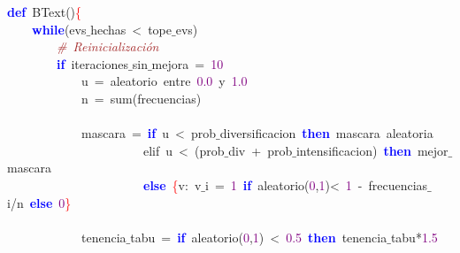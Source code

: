 \noindent
\mbox{}\textbf{\textcolor{Blue}{def}}\ BText\textcolor{BrickRed}{()}\textcolor{Red}{\{} \\
\mbox{}\ \ \ \ \textbf{\textcolor{Blue}{while}}\textcolor{BrickRed}{(}evs$\_$hechas\ \textcolor{BrickRed}{\textless{}}\ tope$\_$evs\textcolor{BrickRed}{)} \\
\mbox{}\ \ \ \ \ \ \ \ \textit{\textcolor{Brown}{\#\ Reinicialización}} \\
\mbox{}\ \ \ \ \ \ \ \ \textbf{\textcolor{Blue}{if}}\ iteraciones$\_$sin$\_$mejora\ \textcolor{BrickRed}{=}\ \textcolor{Purple}{10} \\
\mbox{}\ \ \ \ \ \ \ \ \ \ \ \ u\ \textcolor{BrickRed}{=}\ aleatorio\ entre\ \textcolor{Purple}{0.0}\ y\ \textcolor{Purple}{1.0} \\
\mbox{}\ \ \ \ \ \ \ \ \ \ \ \ n\ \textcolor{BrickRed}{=}\ sum\textcolor{BrickRed}{(}frecuencias\textcolor{BrickRed}{)} \\
\mbox{} \\
\mbox{}\ \ \ \ \ \ \ \ \ \ \ \ mascara\ \textcolor{BrickRed}{=}\ \textbf{\textcolor{Blue}{if}}\ u\ \textcolor{BrickRed}{\textless{}}\ prob$\_$diversificacion\ \textbf{\textcolor{Blue}{then}}\ mascara\ aleatoria \\
\mbox{}\ \ \ \ \ \ \ \ \ \ \ \ \ \ \ \ \ \ \ \ \ \ elif\ u\ \textcolor{BrickRed}{\textless{}}\ \textcolor{BrickRed}{(}prob$\_$div\ \textcolor{BrickRed}{+}\ prob$\_$intensificacion\textcolor{BrickRed}{)}\ \textbf{\textcolor{Blue}{then}}\ mejor$\_$mascara \\
\mbox{}\ \ \ \ \ \ \ \ \ \ \ \ \ \ \ \ \ \ \ \ \ \ \textbf{\textcolor{Blue}{else}}\ \textcolor{Red}{\{}v\textcolor{BrickRed}{:}\ v$\_$i\ \textcolor{BrickRed}{=}\ \textcolor{Purple}{1}\ \textbf{\textcolor{Blue}{if}}\ aleatorio\textcolor{BrickRed}{(}\textcolor{Purple}{0}\textcolor{BrickRed}{,}\textcolor{Purple}{1}\textcolor{BrickRed}{)\textless{}}\ \textcolor{Purple}{1}\ \textcolor{BrickRed}{-}\ frecuencias$\_$i\textcolor{BrickRed}{/}n\ \textbf{\textcolor{Blue}{else}}\ \textcolor{Purple}{0}\textcolor{Red}{\}} \\
\mbox{} \\
\mbox{}\ \ \ \ \ \ \ \ \ \ \ \ tenencia$\_$tabu\ \textcolor{BrickRed}{=}\ \textbf{\textcolor{Blue}{if}}\ aleatorio\textcolor{BrickRed}{(}\textcolor{Purple}{0}\textcolor{BrickRed}{,}\textcolor{Purple}{1}\textcolor{BrickRed}{)}\ \textcolor{BrickRed}{\textless{}}\ \textcolor{Purple}{0.5}\ \textbf{\textcolor{Blue}{then}}\ tenencia$\_$tabu\textcolor{BrickRed}{*}\textcolor{Purple}{1.5} \\
